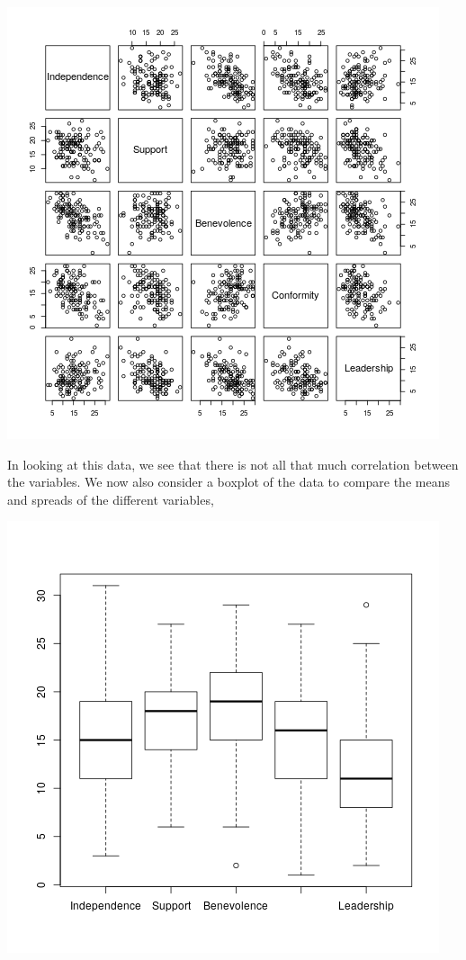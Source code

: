 \documentclass[letterpaper,10pt]{article}
\begin{document}
\begin{enumerate}
\begin{enumerate}
\begin{center}
\includegraphics[scale=.7]{pairs.png}
\end{center}
In looking at this data, we see that there is not all that much correlation between the variables. We now also consider a boxplot of the data to compare the means and spreads of the different variables,
\begin{center}
\includegraphics[scale=.65]{box.png}

\end{center}
\end{enumerate}
\end{enumerate}
\end{document}
